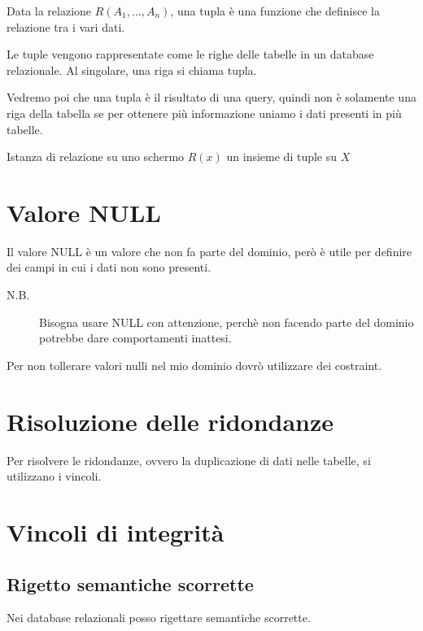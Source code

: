 \begin{assioma}
Data la relazione $ R(A_1 , ..., A_n)$, una tupla è una funzione che definisce la relazione tra i vari dati. 
\end{assioma}

Le tuple vengono rappresentate come le righe delle tabelle in un database relazionale. Al singolare, una riga si chiama tupla.

Vedremo poi che una tupla è il risultato di una query, quindi non è solamente una riga della tabella se per ottenere più informazione uniamo i dati presenti in più tabelle.


\begin{assioma}
Istanza di relazione su uno schermo $R(x)$ un insieme di tuple su $X$
\end{assioma}

\section{Valore NULL}

Il valore NULL è un valore che non fa parte del dominio, però è utile per definire dei campi in cui i dati non sono presenti.

\begin{description}
	\item[N.B.] Bisogna usare NULL con attenzione, perchè non facendo parte del dominio potrebbe dare comportamenti inattesi.
\end{description}

Per non tollerare valori nulli nel mio dominio dovrò utilizzare dei costraint.

\section{Risoluzione delle ridondanze}

Per risolvere le ridondanze, ovvero la duplicazione di dati nelle tabelle, si utilizzano i vincoli.

\section{Vincoli di integrità}

\subsection{Rigetto semantiche scorrette}
Nei database relazionali posso rigettare semantiche scorrette.

